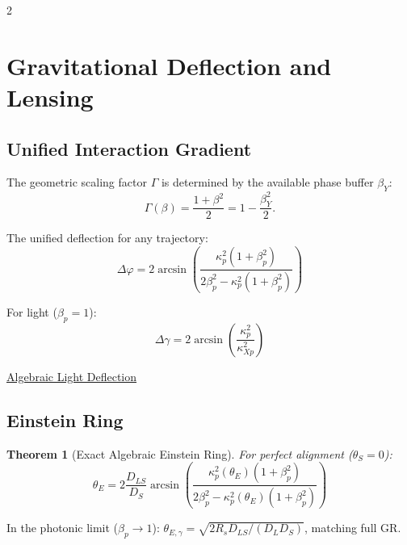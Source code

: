 \documentclass[10pt, a4paper]{article}
\newtheorem{theorem}{Theorem}[section]
\begin{document}
\begin{multicols}{2}
\section{Gravitational Deflection and Lensing}
\hypertarget{sec:grav_optics}{}\label{sec:grav_optics}

\subsection{Unified Interaction Gradient}
\hypertarget{sec:grav_deflection}{}\label{sec:grav_deflection}

The geometric scaling factor $\Gamma$ is determined by the available phase buffer $\beta_Y$:
\begin{equation}
\Gamma(\beta) = \frac{1 + \beta^2}{2} = 1 - \frac{\beta_Y^2}{2}.
\end{equation}

The unified deflection for any trajectory:
\begin{equation}
\boxed{\Delta\varphi = 2\arcsin\!\left(\frac{\kappa_p^2(1+\beta_p^2)}{2\beta_p^2 - \kappa_p^2(1+\beta_p^2)}\right)}
\end{equation}

For light ($\beta_p=1$):
\begin{equation}
\boxed{\Delta\gamma = 2\arcsin\!\left(\frac{\kappa_p^2}{\kappa_{Xp}^2}\right)}
\end{equation}

\begin{tcolorbox}[colback=gray!5, colframe=black!80!black, title=Desmos Project]
\href{https://www.desmos.com/calculator/ldynwowqvi}{Algebraic Light Deflection}
\end{tcolorbox}

\subsection{Einstein Ring}
\hypertarget{sec:grav_lens}{}\label{sec:grav_lens}

\begin{theorem}[Exact Algebraic Einstein Ring]
For perfect alignment ($\theta_S = 0$):
\begin{equation}
\theta_E = 2\frac{D_{LS}}{D_S}\arcsin\!\left(\frac{\kappa_p^2(\theta_E)(1+\beta_p^2)}{2\beta_p^2 - \kappa_p^2(\theta_E)(1+\beta_p^2)}\right)
\end{equation}
\end{theorem}

In the photonic limit ($\beta_p\to 1$): $\theta_{E,\gamma} = \sqrt{2R_s D_{LS}/(D_L D_S)}$, matching full GR.



\end{multicols}
\end{document}
